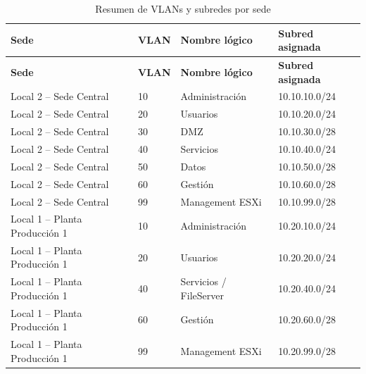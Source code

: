 \documentclass[11pt, a4paper, oneside]{report}
\begin{document}
\begin{xltabular}{\textwidth}{@{}|L{2.5cm}|C{1.5cm}|L{3cm}|X|@{}}
\caption{Resumen de VLANs y subredes por sede}
\label{tab:vlans_subredes_sede} \\

\parbox[c][1.1cm][c]{\linewidth}{\centering\color{white}\bfseries\small Sede} &
\parbox[c][1.1cm][c]{\linewidth}{\centering\color{white}\bfseries\small VLAN} &
\parbox[c][1.1cm][c]{\linewidth}{\centering\color{white}\bfseries\small Nombre lógico} &
\parbox[c][1.1cm][c]{\linewidth}{\centering\color{white}\bfseries\small Subred asignada} \\ \hline
\endfirsthead

\parbox[c][1.1cm][c]{\linewidth}{\centering\color{white}\bfseries\small Sede} &
\parbox[c][1.1cm][c]{\linewidth}{\centering\color{white}\bfseries\small VLAN} &
\parbox[c][1.1cm][c]{\linewidth}{\centering\color{white}\bfseries\small Nombre lógico} &
\parbox[c][1.1cm][c]{\linewidth}{\centering\color{white}\bfseries\small Subred asignada} \\ \hline
\endhead

\hline
\endfoot

{\small Local 2 -- Sede Central} & {\small 10} & {\small Administración} & {\small 10.10.10.0/24} \\ \hline
{\small Local 2 -- Sede Central} & {\small 20} & {\small Usuarios} & {\small 10.10.20.0/24} \\ \hline
{\small Local 2 -- Sede Central} & {\small 30} & {\small DMZ} & {\small 10.10.30.0/28} \\ \hline
{\small Local 2 -- Sede Central} & {\small 40} & {\small Servicios} & {\small 10.10.40.0/24} \\ \hline
{\small Local 2 -- Sede Central} & {\small 50} & {\small Datos} & {\small 10.10.50.0/28} \\ \hline
{\small Local 2 -- Sede Central} & {\small 60} & {\small Gestión} & {\small 10.10.60.0/28} \\ \hline
{\small Local 2 -- Sede Central} & {\small 99} & {\small Management ESXi} & {\small 10.10.99.0/28} \\ \hline

{\small Local 1 -- Planta Producción 1} & {\small 10} & {\small Administración} & {\small 10.20.10.0/24} \\ \hline
{\small Local 1 -- Planta Producción 1} & {\small 20} & {\small Usuarios} & {\small 10.20.20.0/24} \\ \hline
{\small Local 1 -- Planta Producción 1} & {\small 40} & {\small Servicios / FileServer} & {\small 10.20.40.0/24} \\ \hline
{\small Local 1 -- Planta Producción 1} & {\small 60} & {\small Gestión} & {\small 10.20.60.0/28} \\ \hline
{\small Local 1 -- Planta Producción 1} & {\small 99} & {\small Management ESXi} & {\small 10.20.99.0/28} \\ \hline


\end{xltabular}
\end{document}

